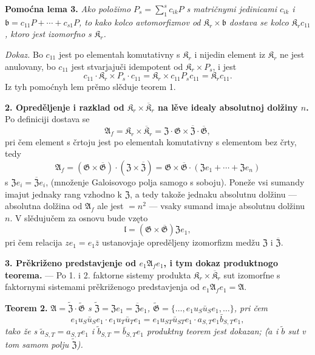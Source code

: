 \documentclass[11pt]{article}
\begin{document}
\noindent\textbf{Pomoćna lema 3.} \emph{Ako položimo \(P_s=\sum_1^s c_{ik}P\) s matričnymi jedinicami \(c_{ik}\) i \(\mathfrak b=c_{11}P+\cdots+c_{s1}P\), to kako kolco avtomorfizmov od \(\mathfrak K_r\times\mathfrak b\) dostava se kolco \(\mathfrak K_rc_{11}\), ktoro jest izomorfno s \(\mathfrak K_r\).}

\noindent\emph{Dokaz.} Bo \(c_{11}\) jest po elementah komutativny s \(\mathfrak K_r\) i nijedin element iz \(\mathfrak K_r\) ne jest anulovany, bo \(c_{11}\) jest stvarjajuči idempotent od \(\mathfrak K_r\times P_s\), i jest
\[
c_{11}\cdot\mathfrak K_r\times P_s\cdot c_{11}
=\mathfrak K_r\times c_{11}P_sc_{11}
=\mathfrak K_rc_{11}.
\]
Iz tyh pomoćnyh lem prěmo slěduje teorem 1.

\noindent\textbf{2. Opreděljenje i razklad od \(\mathfrak K_r\times\overline{\mathfrak K}_r\) na lěve idealy absolutnoj dolžiny \(n\).} Po definiciji dostava se
\[
\mathfrak A_f=\mathfrak K_r\times\overline{\mathfrak K}_r
=\mathfrak Z\cdot\mathfrak G\times\overline{\mathfrak Z}\cdot\overline{\mathfrak G},
\]
pri čem element s črtoju jest po elementah komutativny s elementom bez črty, tedy
\[
\mathfrak A_f
=(\mathfrak G\times\overline{\mathfrak G})\cdot(\mathfrak Z\times\overline{\mathfrak Z})
=\mathfrak G\times\overline{\mathfrak G}\cdot(\mathfrak Ze_1+\cdots+\mathfrak Ze_n)
\]
s \(\mathfrak Ze_i=\overline{\mathfrak Z}e_i\), (množenje Galoisovogo polja samogo s soboju). Poneže vsi sumandy imajut jednaky rang vzhodno k \(\mathfrak Z\), a tedy takože jednaku absolutnu dolžinu --- absolutna dolžina od \(\mathfrak A_f\) ale jest \(=n^2\) --- vsaky sumand imaje absolutnu dolžinu \(n\). V slědujučem za osnovu bude vzęto
\[
\mathfrak l=(\mathfrak G\times\overline{\mathfrak G})\mathfrak Ze_1,
\]
pri čem relacija \(ze_1=e_1\bar z\) ustanovjaje opreděljeny izomorfizm medžu \(\mathfrak Z\) i \(\overline{\mathfrak Z}\).

\noindent\textbf{3. Prěkriženo predstavjenje od \(e_1\mathfrak A_fe_1\), i tym dokaz produktnogo teorema.} --- Po 1. i 2. faktorne sistemy produkta \(\mathfrak K_r\times\overline{\mathfrak K}_r\) sut izomorfne s faktornymi sistemami prěkriženogo predstavjenja od \(e_1\mathfrak A_fe_1=\mathfrak A\).

\noindent\textbf{Teorem 2.} \emph{\(\mathfrak A=\widetilde{\mathfrak Z}\cdot\widetilde{\mathfrak G}\) s \(\widetilde{\mathfrak Z}=\mathfrak Ze_1=\overline{\mathfrak Z}e_1\), \(\widetilde{\mathfrak G}=\{\ldots,e_1u_S\bar u_Se_1,\ldots\}\), pri čem
\[
e_1u_S\bar u_Se_1\cdot e_1u_T\bar u_Te_1
=e_1u_{ST}\bar u_{ST}e_1\cdot a_{S,T}e_1\bar b_{S,T}e_1,
\]
tako že s \(\tilde a_{S,T}=a_{S,T}e_1\) i \(\tilde b_{S,T}=\bar b_{S,T}e_1\) produktny teorem jest dokazan; (\(\tilde a\) i \(\tilde b\) sut v tom samom polju \(\widetilde{\mathfrak Z}\)).}
\end{document}
